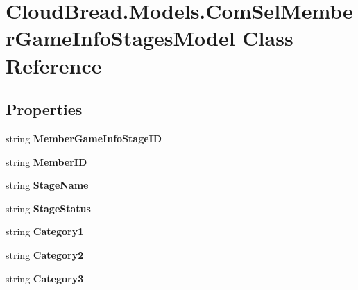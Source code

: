 \hypertarget{a00061}{}\section{Cloud\+Bread.\+Models.\+Com\+Sel\+Member\+Game\+Info\+Stages\+Model Class Reference}
\label{a00061}
\subsection*{Properties}
\begin{DoxyCompactItemize}
\item 
string {\bfseries Member\+Game\+Info\+Stage\+ID}\hypertarget{a00061_ab721db9cebd01ec850cc50a96d35a415}{}\label{a00061_ab721db9cebd01ec850cc50a96d35a415}

\item 
string {\bfseries Member\+ID}\hypertarget{a00061_aed37ccd97e25bd597f340805c22a9d0f}{}\label{a00061_aed37ccd97e25bd597f340805c22a9d0f}

\item 
string {\bfseries Stage\+Name}\hypertarget{a00061_a0af7751d1419cfcbe7df842f2045af9d}{}\label{a00061_a0af7751d1419cfcbe7df842f2045af9d}

\item 
string {\bfseries Stage\+Status}\hypertarget{a00061_a5f9ffd90b154441d1f03a0cb36a6a351}{}\label{a00061_a5f9ffd90b154441d1f03a0cb36a6a351}

\item 
string {\bfseries Category1}\hypertarget{a00061_a20baf96f2ff499cbd6f68aa4cc900269}{}\label{a00061_a20baf96f2ff499cbd6f68aa4cc900269}

\item 
string {\bfseries Category2}\hypertarget{a00061_aebca996e73f524f65c29743748752f50}{}\label{a00061_aebca996e73f524f65c29743748752f50}

\item 
string {\bfseries Category3}\hypertarget{a00061_a2a7ccb8574b19fc3551542ad3a8c3997}{}\label{a00061_a2a7ccb8574b19fc3551542ad3a8c3997}


\end{DoxyCompactItemize}
